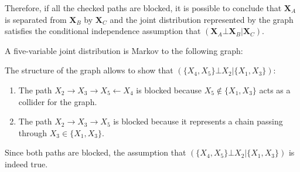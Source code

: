 \documentclass{report}
\begin{document}
Therefore, if all the checked paths are blocked, it is possible to conclude that $\displaystyle \mathbf{X}_A$ is separated from $\displaystyle \mathbf{X}_B$ by $\displaystyle \mathbf{X}_C$ and the joint distribution represented by the graph satisfies the conditional independence assumption that $\displaystyle (\mathbf{X}_A \bot \mathbf{X}_B|\mathbf{X}_C)$.
\begin{examplebox}
    A five-variable joint distribution is Markov to the following graph:


    \noindent The structure of the graph allows to show that $\displaystyle (\{X_4, X_5\} \bot X_2|\{X_1, X_3\})$:
    \begin{enumerate}
        \item The path $\displaystyle X_2 \to X_3 \to X_5 \gets X_4$ is blocked because $\displaystyle X_5 \notin \{X_1, X_3\}$ acts as a collider for the graph.
        \item The path $\displaystyle X_2 \to X_3 \to X_5$ is blocked because it represents a chain passing through $\displaystyle X_3 \in \{X_1, X_3\}$.
    \end{enumerate}
    Since both paths are blocked, the assumption that $\displaystyle (\{X_4, X_5\} \bot X_2|\{X_1, X_3\})$ is indeed true.
\end{examplebox}
\end{document}
